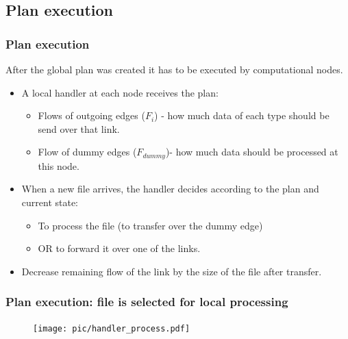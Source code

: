 \documentclass{beamer}
\begin{document}
\subsection{Plan execution}
\begin{frame}\frametitle{Plan execution}

After the global plan was created it has to be executed by computational nodes.

\begin{block}{}
\begin{itemize}
\item A local handler at each node receives the plan:

\begin{itemize}
\footnotesize
\item Flows of outgoing edges ($F_{i}$) - how much data of each type should be send over that link.
\item Flow of dummy edges ($F_{dummy}$)- how much data should be processed at this node.
 \end{itemize}

\item When a new file arrives, the handler decides according to the plan and current state:

\begin{itemize}
\footnotesize
 \item To process the file (to transfer over the dummy edge)
 \item OR to forward it over one of the links.  
 \end{itemize}
 \item Decrease remaining flow of the link by the size of the file after transfer.
\end{itemize}
\end{block}    





\end{frame}

\begin{frame}\frametitle{Plan execution: file is selected for local processing}
\begin{figure}[h]
		\texttt{[image: pic/handler\_process.pdf]}
	\label{real_network}
\end{figure} 
\end{frame}
\end{document}
